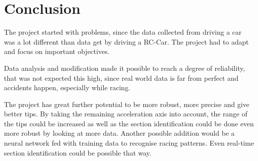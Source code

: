 \chapter{Conclusion}
The project started with problems, since the data collected from driving a car was a lot different than data get by driving a RC-Car. The project had to adapt and focus on important objectives.

Data analysis and modification made it possible to reach a degree of reliability, that was not expected this high, since real world data is far from perfect and accidents happen, especially while racing.

The project has great further potential to be more robust, more precise and give better tips. By taking the remaining acceleration axis into account, the range of the tips could be increased as well as the section identification could be done even more robust by looking at more data. Another possible addition would be a neural network fed with training data to recognise racing patterns. Even real-time section identification could be possible that way. 